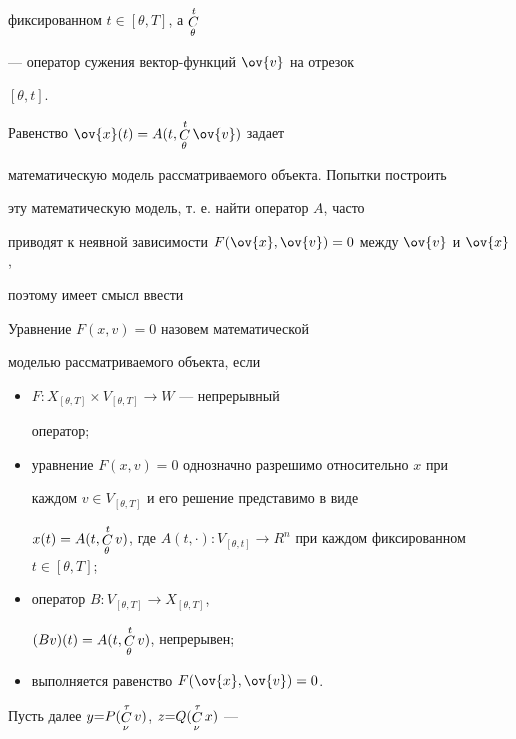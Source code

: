 фиксированном $t\in[\theta,T]$, а $\displaystyle\mathop{C}^{t}_{\theta}$


--- оператор сужения вектор-функций $\ov{v}$ на отрезок


$[\theta,t]$.





Равенство $\ov{x}(t)=A(t,\Cu^t_\theta \ov{v})$ задает


математическую модель рассматриваемого объекта. Попытки построить


эту математическую модель, т. е. найти оператор $A$, часто


приводят к неявной зависимости $F(\ov{x},\ov{v})=0$ между $\ov{v}$ и $\ov{x}$,


поэтому имеет смысл ввести





\begin{defn}


Уравнение $F(x,v)=0$ назовем математической


моделью рассматриваемого объекта, если


\begin{itemize}


\item[1)] $F:X_{[\theta,T]}\times V_{[\theta,T]}\to W$ --- непрерывный


оператор;


\item[2)] уравнение $F(x,v)=0$ однозначно разрешимо относительно $x$ при


каждом $v\in V_{[\theta,T]}$ и его решение представимо в виде


$x(t)=A(t,\Cu^t_\theta v)$, где $A(t,\cdot):V_{[\theta,t]}\to


R^n$ при каждом фиксированном $t\in[\theta,T]$;


\item[3)] оператор $B:V_{[\theta,T]}\to X_{[\theta,T]}$,


$(Bv)(t)=A(t,\displaystyle\mathop{C}^t_\theta v)$, непрерывен;


\item[4)] выполняется равенство $F(\ov{x},\ov{v})=0$.


\end{itemize}


\end{defn}





Пусть далее $y{=}P(\displaystyle\mathop{C}^\tau_\nu v)$, $z{=}Q(\displaystyle\mathop{C}^\tau_\nu x)$ ---


